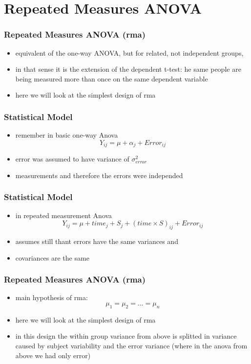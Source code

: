 \section{Repeated Measures ANOVA}
\begin{frame}\frametitle{Repeated Measures ANOVA (rma)}
  \begin{itemize}
  \item equivalent of the one-way ANOVA, but for related, not independent groups,  \item in that sense it is the extension of the dependent t-test: he same people are being measured more than once on the same dependent variable
  \item here we will look at the simplest design of rma
  \end{itemize}
\end{frame}


\begin{frame}\frametitle{Statistical Model}
  \begin{itemize}
  \item remember in basic one-way Anova $$Y_{ij} = \mu + \alpha_j + Error_{ij}$$
  \item error was assumed to have variance of $\sigma^2_{error}$
  \item measurements and therefore the errors were independed
  \end{itemize}
\end{frame}


\begin{frame}\frametitle{Statistical Model}
  \begin{itemize}
  \item in repeated measurement Anova $$Y_{ij} = \mu + time_j + S_j + (time\times S)_{ij} + Error_{ij}$$
  \item assumes still thant errors have the same variances and
  \item covariances are the same
  \end{itemize}
\end{frame}



\begin{frame}\frametitle{Repeated Measures ANOVA (rma)}
  \begin{itemize}
  \item main hypothesis of rma: $$\mu_1=\mu_2=\ldots =\mu_n$$
  \item here we will look at the simplest design of rma
  \item in this design the within group variance from above is splitted in variance caused by subject variability and the error variance (where in the anova from above we had only error) 
  \end{itemize}
\end{frame}


